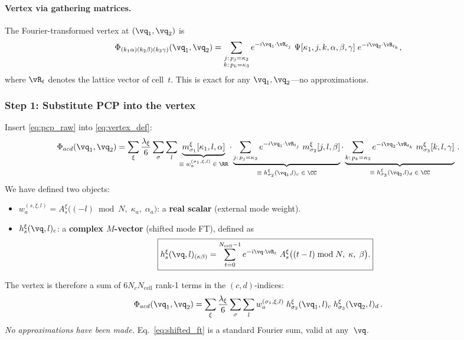 \paragraph{Vertex via gathering matrices.}
The Fourier-transformed vertex at $(\vq_1, \vq_2)$ is
\begin{equation}\label{eq:vertex_def}
  \Phi_{(k_1\alpha)(k_2\beta)(k_3\gamma)}(\vq_1, \vq_2)
  = \sum_{\substack{j:\, p_j = \kappa_2 \\ k:\, p_k = \kappa_3}}
    e^{-i\vq_1 \cdot \vR_{t_j}}\;
    \Psi[\kappa_1, j, k, \alpha, \beta, \gamma]\;
    e^{-i\vq_2 \cdot \vR_{t_k}},
\end{equation}
where $\vR_t$ denotes the lattice vector of cell~$t$.  This is
exact for any $\vq_1, \vq_2$---no approximations.


\subsubsection{Step 1: Substitute PCP into the vertex}
\label{sssub:step1}

Insert \cref{eq:pcp_raw} into \cref{eq:vertex_def}:
\begin{equation}\label{eq:vertex_pcp_raw}
  \Phi_{acd}(\vq_1, \vq_2)
  = \sum_\xi \frac{\lambda_\xi}{6} \sum_\sigma \sum_l
    \underbrace{m_{\sigma_1}^{\xi}[\kappa_1, l, \alpha]}_{
      \equiv\; w^{(\sigma_1,\xi,l)}_a \;\in\;\RR}
    \cdot
    \underbrace{
      \sum_{j:\,p_j=\kappa_2}
      e^{-i\vq_1\cdot\vR_{t_j}}\;
      m_{\sigma_2}^{\xi}[j, l, \beta]
    }_{\equiv\; h_{\sigma_2}^{\xi}(\vq_1, l)_c \;\in\;\CC}
    \cdot
    \underbrace{
      \sum_{k:\,p_k=\kappa_3}
      e^{-i\vq_2\cdot\vR_{t_k}}\;
      m_{\sigma_3}^{\xi}[k, l, \gamma]
    }_{\equiv\; h_{\sigma_3}^{\xi}(\vq_2, l)_d \;\in\;\CC}\,.
\end{equation}
We have defined two objects:
\begin{itemize}
  \item $w_a^{(s,\xi,l)} = A_s^\xi\bigl((-l)\bmod N,\; \kappa_a,\; \alpha_a\bigr)$:
    a \textbf{real scalar} (external mode weight).
  \item $h_s^{\xi}(\vq, l)_c$: a \textbf{complex $M$-vector} (shifted
    mode FT), defined as
    \begin{equation}\label{eq:shifted_ft}
      \boxed{
      h_s^{\xi}(\vq, l)_{(\kappa\beta)}
      = \sum_{t=0}^{N_\mathrm{cell}-1}
        e^{-i\vq\cdot\vR_t}\;
        A_s^{\xi}\bigl((t - l)\bmod N,\; \kappa,\; \beta\bigr).
      }
    \end{equation}
\end{itemize}
The vertex is therefore a sum of $6 N_c N_\mathrm{cell}$ rank-1 terms
in the $(c, d)$-indices:
\begin{equation}\label{eq:vertex_rank1}
  \Phi_{acd}(\vq_1, \vq_2)
  = \sum_\xi \frac{\lambda_\xi}{6} \sum_\sigma \sum_l
    w_a^{(\sigma_1,\xi,l)}\;
    h_{\sigma_2}^{\xi}(\vq_1, l)_c\;
    h_{\sigma_3}^{\xi}(\vq_2, l)_d\,.
\end{equation}
\emph{No approximations have been made.}  Eq.~\eqref{eq:shifted_ft}
is a standard Fourier sum, valid at any~$\vq$.


